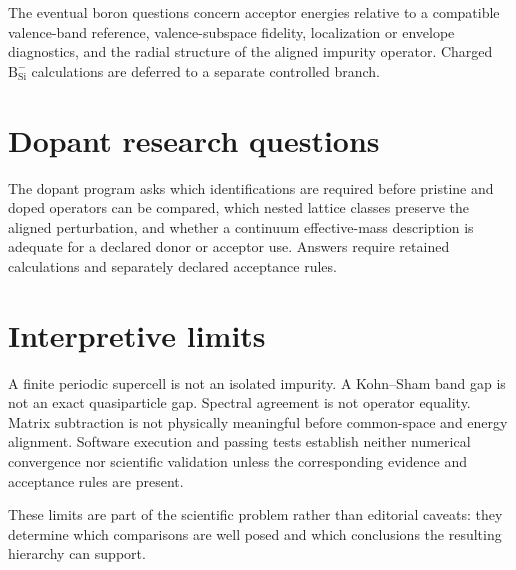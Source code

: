 The eventual boron questions concern acceptor energies relative to a
compatible valence-band reference, valence-subspace fidelity, localization or
envelope diagnostics, and the radial structure of the aligned impurity
operator. Charged $\mathrm{B}_{\mathrm{Si}}^{-}$ calculations are deferred to
a separate controlled branch.

\section{Dopant research questions}


The dopant program asks which identifications are required before pristine and
doped operators can be compared, which nested lattice classes preserve the
aligned perturbation, and whether a continuum effective-mass description is
adequate for a declared donor or acceptor use. Answers require retained
calculations and separately declared acceptance rules.

\section{Interpretive limits}

A finite periodic supercell is not an isolated impurity. A Kohn--Sham band gap
is not an exact quasiparticle gap. Spectral agreement is not operator equality.
Matrix subtraction is not physically meaningful before common-space and
energy alignment. Software execution and passing tests establish neither
numerical convergence nor scientific validation unless the corresponding
evidence and acceptance rules are present.

These limits are part of the scientific problem rather than editorial caveats:
they determine which comparisons are well posed and which conclusions the
resulting hierarchy can support.

